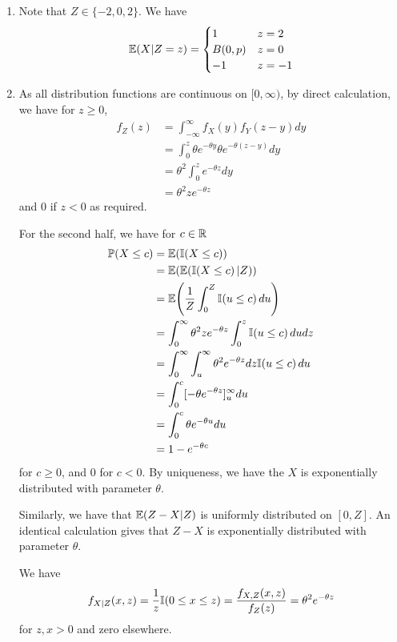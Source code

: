 \begin{enumerate}
\item Note that $Z \in \{-2, 0, 2\}$. We have
  \begin{equation}
    \label{eq:5}
    \E{X|Z=z} =
    \begin{cases}
      1 & z = 2 \\
      B(0, p) & z = 0 \\
      -1 & z = -1
    \end{cases}
  \end{equation}

\item As all distribution functions are continuous on $[0, \infty)$,
  by direct calculation, we have for $z \geq 0$,
  \begin{align}
    \label{eq:6}
    f_{Z}(z) &= \int_{-\infty}^{\infty} f_{X}(y) f_{Y}(z - y) dy \\
    &= \int_{0}^{z} \theta e^{-\theta y} \theta e^{-\theta(z - y)} dy
    \\
    &= \theta^{2} \int_{0}^{z} e^{-\theta z} dy \\
    &= \theta^{2} z e^{-\theta z}
  \end{align} and $0$ if $z < 0$ as required.

  For the second half, we have for $c \in \mathbb{R}$
  \begin{align}
    \label{eq:7}
    \Prob{X \leq c} &= \E{\I{X \leq c}} \\
    &= \E{\E{\I{X \leq c} |Z}} \\
    &= \E{\frac{1}{Z}\int_{0}^{Z}\I{u \leq c} du} \\
    &= \int_{0}^{\infty} \theta^{2} z e^{-\theta z} \int_{0}^{z} \I{u
      \leq c} du dz \\
    &= \int_{0}^{\infty} \int_{u}^{\infty} \theta^{2} e^{-\theta z} dz
    \I{u \leq c} du \\
    &= \int_{0}^{c} [-\theta e^{-\theta z}]_{u}^{\infty} du \\
    &= \int_{0}^{c} \theta e^{-\theta u} du \\
    &= 1 - e^{-\theta c}
  \end{align} for $c \geq 0$, and $0$ for $c < 0$. By uniqueness, we
  have the $X$ is exponentially distributed with parameter $\theta$.

  Similarly, we have that $\E{Z - X | Z}$ is uniformly distributed on
  $[0, Z]$. An identical calculation gives that $Z - X$ is
  exponentially distributed with parameter $\theta$.

  We have
  \begin{align*}
    f_{X|Z}(x, z) = \frac{1}{z} \I{0 \leq x \leq z} = \frac{f_{X,Z}(x,
      z)}{f_{Z}(z)} = \theta^{2} e ^{-\theta z}
  \end{align*} for $z, x > 0$ and zero elsewhere.


\end{enumerate}
